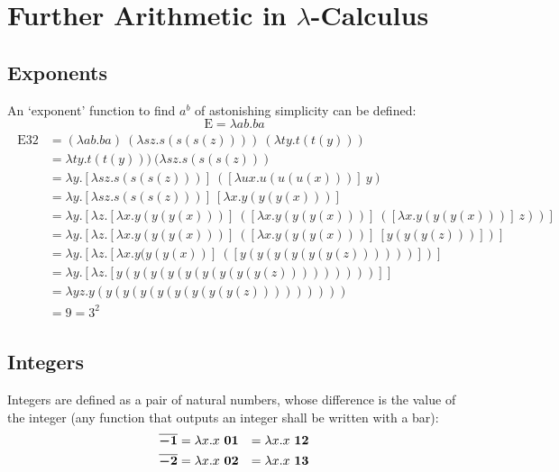 \documentclass[Master.tex]{subfiles}
\begin{document}
\appendix
\appendixpage
\section{Further Arithmetic in $\lambda$-Calculus}\label{appendix:lambdaarithmetic}

\subsection{Exponents}

An `exponent' function to find $a^b$ of astonishing simplicity can be defined:
\cite{barendregt1984introduction}
\begin{equation*}
\bm{\mathrm{E}} = \lambda ab.ba
\end{equation*}
\begin{gather*}
\begin{aligned}
\bm{\mathrm{E32}} &= (\lambda ab.ba)\ (\lambda sz.s(s(s(z))))\ (\lambda ty.t(t(y)))\\
&= \lambda ty.t(t(y)))\ (\lambda sz.s(s(s(z)))\\
&= \lambda y.[\lambda sz.s(s(s(z)))]\ ([\lambda ux.u(u(u(x)))]\ y)\\
&= \lambda y.[\lambda sz.s(s(s(z)))]\ [\lambda x.y(y(y(x)))]\\
&= \lambda y.[\lambda z.[\lambda x.y(y(y(x)))]\ ([\lambda x.y(y(y(x)))]\ ([\lambda x.y(y(y(x)))]\ z))]\\
&= \lambda y.[\lambda z.[\lambda x.y(y(y(x)))]\ ([\lambda x.y(y(y(x)))]\ [y(y(y(z)))])]\\
&= \lambda y.[\lambda z.[\lambda x.y(y(y(x))]\ ([y(y(y(y(y(y(z))))))])]\\
&= \lambda y.[\lambda z.[y(y(y(y(y(y(y(y(y(z)))))))))]]\\
&= \lambda yz.y(y(y(y(y(y(y(y(y(z)))))))))\\
&= \bm{\mathrm{9}} = \bm{\mathrm{3^2}}
\end{aligned}
\end{gather*}

\subsection{Integers}

Integers are defined as a pair of natural numbers, whose difference is the value of the integer (any function that outputs an integer shall be written with a bar):
\begin{gather*}
\begin{aligned}
\overline{\bm{\mathrm{-1}}} &= \lambda x.x\ \bm{\mathrm{01}} &= \lambda x.x\ \bm{\mathrm{12}}\\
\overline{\bm{\mathrm{-2}}} &= \lambda x.x\ \bm{\mathrm{02}} &= \lambda x.x\ \bm{\mathrm{13}}
\end{aligned}    
\end{gather*}
\end{document}
